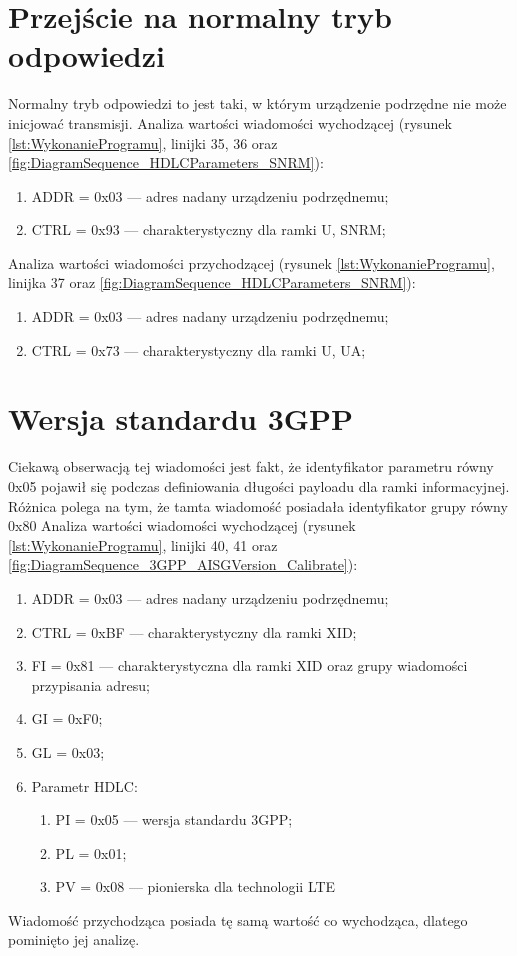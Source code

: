 \section{Przejście na normalny tryb odpowiedzi}
Normalny tryb odpowiedzi to jest taki, w którym urządzenie podrzędne nie może inicjować transmisji.
Analiza wartości wiadomości wychodzącej 
(rysunek \ref{lst:WykonanieProgramu}, linijki 35, 36 oraz \ref{fig:DiagramSequence_HDLCParameters_SNRM}):
\begin{enumerate}
    \item ADDR = 0x03 --- adres nadany urządzeniu podrzędnemu;
    \item CTRL = 0x93 --- charakterystyczny dla ramki U, SNRM;
\end{enumerate}
\bigskip
Analiza wartości wiadomości przychodzącej
(rysunek \ref{lst:WykonanieProgramu}, linijka 37 oraz \ref{fig:DiagramSequence_HDLCParameters_SNRM}):
\begin{enumerate}
    \item ADDR = 0x03 --- adres nadany urządzeniu podrzędnemu;
    \item CTRL = 0x73 --- charakterystyczny dla ramki U, UA;
\end{enumerate}


\section{Wersja standardu 3GPP}
Ciekawą obserwacją tej wiadomości jest fakt, że identyfikator parametru równy 0x05 pojawił się podczas definiowania długości payloadu
dla ramki informacyjnej. Różnica polega na tym, że tamta wiadomość posiadała identyfikator grupy równy 0x80
\newline\newline
Analiza wartości wiadomości wychodzącej 
(rysunek \ref{lst:WykonanieProgramu}, linijki {40, 41} oraz \ref{fig:DiagramSequence_3GPP_AISGVersion_Calibrate}):
\begin{enumerate}
    \item ADDR = 0x03 --- adres nadany urządzeniu podrzędnemu;
    \item CTRL = 0xBF --- charakterystyczny dla ramki XID;
    \item FI = 0x81 --- charakterystyczna dla ramki XID oraz grupy wiadomości przypisania adresu;
    \item GI = 0xF0;
    \item GL = 0x03;
    \item Parametr HDLC:
    \begin{enumerate}
        \item PI = 0x05 --- wersja standardu 3GPP;
        \item PL = 0x01;
        \item PV = 0x08 --- pionierska dla technologii LTE
    \end{enumerate}
\end{enumerate}
Wiadomość przychodząca posiada tę samą wartość co wychodząca, dlatego pominięto jej analizę.

